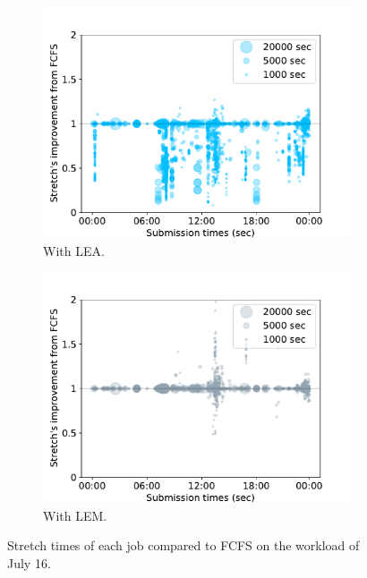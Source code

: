 \documentclass[conference,10pt]{IEEEtran}
\begin{document}
\begin{figure}[t]\begin{subfigure}[b]{0.49\linewidth}\centering\includegraphics[width=0.9\linewidth]{../MBSS/plot/Stretch_times/Stretch_times_FCFS_LEA_2022-07-16->2022-07-16_V10000_450_128_32_256_4_1024.pdf}\caption{With LEA.}\label{07_16_fcfs_vs_lea}\end{subfigure}
\begin{subfigure}[b]{0.49\linewidth}\centering\includegraphics[width=0.9\linewidth]{../MBSS/plot/Stretch_times/Stretch_times_FCFS_LEM_2022-07-16->2022-07-16_V10000_450_128_32_256_4_1024.pdf}\caption{With LEM.}\label{07_16_fcfs_vs_lem}\end{subfigure}\caption{Stretch times of each job compared to FCFS on the workload of July 16.}\end{figure}
\end{document}

